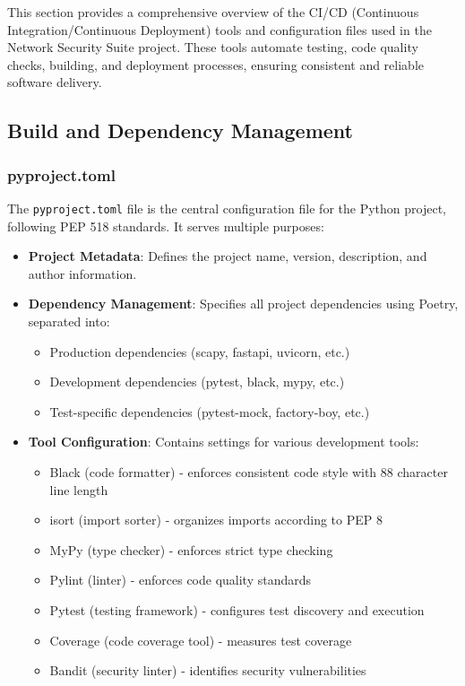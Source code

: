 This section provides a comprehensive overview of the CI/CD (Continuous Integration/Continuous Deployment) tools and configuration files used in the Network Security Suite project. These tools automate testing, code quality checks, building, and deployment processes, ensuring consistent and reliable software delivery.

\subsection{Build and Dependency Management}

\subsubsection{pyproject.toml}
The \texttt{pyproject.toml} file is the central configuration file for the Python project, following PEP 518 standards. It serves multiple purposes:

\begin{itemize}
    \item \textbf{Project Metadata}: Defines the project name, version, description, and author information.
    \item \textbf{Dependency Management}: Specifies all project dependencies using Poetry, separated into:
    \begin{itemize}
        \item Production dependencies (scapy, fastapi, uvicorn, etc.)
        \item Development dependencies (pytest, black, mypy, etc.)
        \item Test-specific dependencies (pytest-mock, factory-boy, etc.)
    \end{itemize}
    \item \textbf{Tool Configuration}: Contains settings for various development tools:
    \begin{itemize}
        \item Black (code formatter) - enforces consistent code style with 88 character line length
        \item isort (import sorter) - organizes imports according to PEP 8
        \item MyPy (type checker) - enforces strict type checking
        \item Pylint (linter) - enforces code quality standards
        \item Pytest (testing framework) - configures test discovery and execution
        \item Coverage (code coverage tool) - measures test coverage
        \item Bandit (security linter) - identifies security vulnerabilities
    \end{itemize}
\end{itemize}

